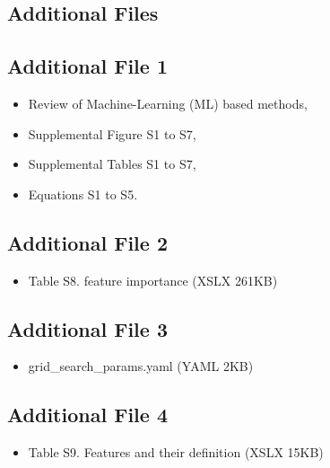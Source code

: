 \documentclass{bmcart}
\begin{document}
\begin{backmatter}
\clearpage

\section*{Additional Files}
\subsection*{Additional File 1} \label{add:figs_tbls}
    
\begin{itemize}
\item Review of Machine-Learning (ML) based methods, \\
\item     Supplemental Figure S1 to S7, \\
\item     Supplemental Tables S1 to S7,\\
\item     Equations S1 to S5.
\end{itemize}
   
\subsection*{Additional File 2}  \label{add:feature importance}
  
\begin{itemize}
\item Table S8. feature importance (XSLX 261KB)
\end{itemize}

\subsection*{Additional File 3}  \label{add:hyperoptparams}
\begin{itemize}
\item    grid\_search\_params.yaml (YAML 2KB)
\end{itemize}

\subsection*{Additional File 4}  \label{add:feature_definition}
\begin{itemize}
\item   Table S9. Features and their definition (XSLX 15KB)
\end{itemize}


\end{backmatter}
\end{document}
